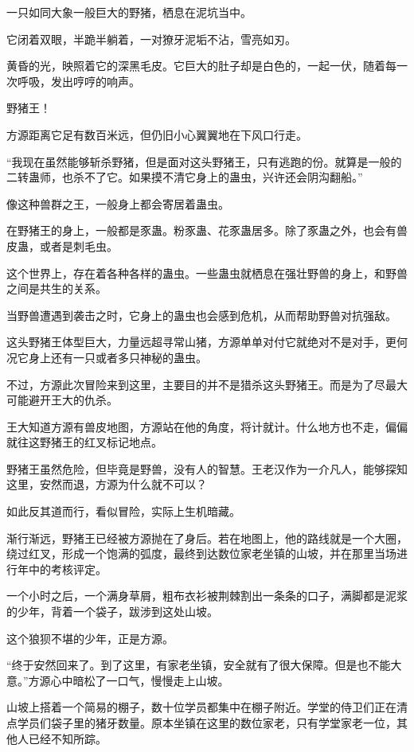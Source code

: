 
\begin{this_body}

一只如同大象一般巨大的野猪，栖息在泥坑当中。

它闭着双眼，半跪半躺着，一对獠牙泥垢不沾，雪亮如刃。

黄昏的光，映照着它的深黑毛皮。它巨大的肚子却是白色的，一起一伏，随着每一次呼吸，发出哼哼的响声。

野猪王！

方源距离它足有数百米远，但仍旧小心翼翼地在下风口行走。

“我现在虽然能够斩杀野猪，但是面对这头野猪王，只有逃跑的份。就算是一般的二转蛊师，也杀不了它。如果摸不清它身上的蛊虫，兴许还会阴沟翻船。”

像这种兽群之王，一般身上都会寄居着蛊虫。

在野猪王的身上，一般都是豕蛊。粉豕蛊、花豕蛊居多。除了豕蛊之外，也会有兽皮蛊，或者是刺毛虫。

这个世界上，存在着各种各样的蛊虫。一些蛊虫就栖息在强壮野兽的身上，和野兽之间是共生的关系。

当野兽遭遇到袭击之时，它身上的蛊虫也会感到危机，从而帮助野兽对抗强敌。

这头野猪王体型巨大，力量远超寻常山猪，方源单单对付它就绝对不是对手，更何况它身上还有一只或者多只神秘的蛊虫。

不过，方源此次冒险来到这里，主要目的并不是猎杀这头野猪王。而是为了尽最大可能避开王大的仇杀。

王大知道方源有兽皮地图，方源站在他的角度，将计就计。什么地方也不走，偏偏就往这野猪王的红叉标记地点。

野猪王虽然危险，但毕竟是野兽，没有人的智慧。王老汉作为一介凡人，能够探知这里，安然而退，方源为什么就不可以？

如此反其道而行，看似冒险，实际上生机暗藏。

渐行渐远，野猪王已经被方源抛在了身后。若在地图上，他的路线就是一个大圈，绕过红叉，形成一个饱满的弧度，最终到达数位家老坐镇的山坡，并在那里当场进行年中的考核评定。

一个小时之后，一个满身草屑，粗布衣衫被荆棘割出一条条的口子，满脚都是泥浆的少年，背着一个袋子，跋涉到这处山坡。

这个狼狈不堪的少年，正是方源。

“终于安然回来了。到了这里，有家老坐镇，安全就有了很大保障。但是也不能大意。”方源心中暗松了一口气，慢慢走上山坡。

山坡上搭着一个简易的棚子，数十位学员都集中在棚子附近。学堂的侍卫们正在清点学员们袋子里的猪牙数量。原本坐镇在这里的数位家老，只有学堂家老一位，其他人已经不知所踪。


\end{this_body}
